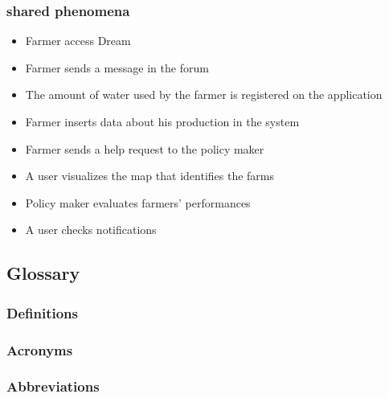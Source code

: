 \subsubsection{shared phenomena}

\begin{itemize}
    \item Farmer access Dream
    \item Farmer sends a message in the forum
    \item The amount of water used by the farmer is registered on the application
    \item Farmer inserts data about his production in the system
    \item Farmer sends a help request to the policy maker
    \item A user visualizes the map that identifies the farms
    \item Policy maker evaluates farmers' performances
    \item A user checks notifications
    
\end{itemize}

\subsection{Glossary}
\subsubsection{Definitions}
\subsubsection{Acronyms}
\subsubsection{Abbreviations}

